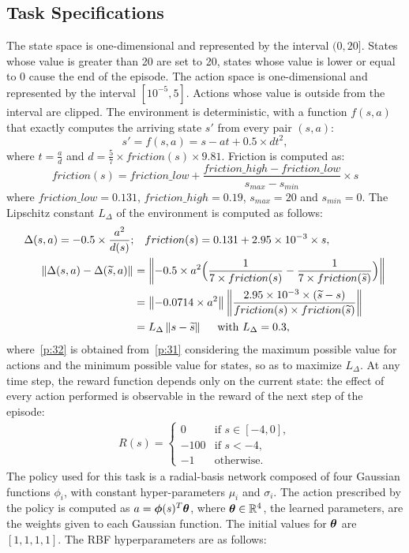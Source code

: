 \subsection*{Task Specifications}
The state space is one-dimensional and represented by the interval $(0,20]$. States whose value is greater than 20 are set to 20, states whose value is lower or equal to 0 cause the end of the episode. The action space is one-dimensional and represented by the interval $[10^{-5}, 5]$. Actions whose value is outside from the interval are clipped. The environment is deterministic, with a function $f(s,a)$ that exactly computes the arriving state $s'$ from every pair $(s,a)$:
\[
s'=f(s,a) = s - at + 0.5 \times dt^2,
\]
where $t=\frac{a}{d}$ and $d = \frac{5}{7} \times friction(s) \times 9.81$.
Friction is computed as:
\[
friction(s) = friction\_low + \frac{friction\_high - friction\_low}{s_{max} - s_{min}} \times s
\]
where $friction\_low=0.131$, $friction\_high=0.19$, $s_{max}=20$ and $s_{min}=0$. The Lipschitz constant $L_{\Delta}$ of the environment is computed as follows:\\
\begin{align}
\Delta(s,a) = -0.5 \times \frac{a^2}{d(s)}; &\quad friction(s) = 0.131 + 2.95 \times 10^{-3} \times s, \nonumber\\
\left\|\Delta(s,a) - \Delta(\widetilde{s},a)\right\|_{} &= \left\| -0.5 \times a^2 \Big(\frac{1}{7 \times friction(s)} - \frac{1}{7 \times friction(\widetilde{s})} \Big)\right\|_{} \nonumber\\
&= \left\|-0.0714 \times a^2\right\|_{}\left\|\frac {2.95 \times 10^{-3} \times (\widetilde{s} -s)} {friction(s) \times friction(\widetilde{s})}\right\|_{}\label{p:31}\\
&= L_{\Delta} \left\|s - \widetilde{s}\right\|_{} \quad \text{ with }L_{\Delta}=0.3, \label{p:32}
\end{align}
where~\eqref{p:32} is obtained from~\eqref{p:31} considering the maximum possible value for actions and the minimum possible value for states, so as to maximize $L_{\Delta}$.
At any time step, the reward function depends only on the current state: the effect of every action performed is observable in the reward of the next step of the episode: 
\begin{align}
R(s) = 
\begin{cases}
0 & \text{if } s \in [-4,0],\\
-100 & \text{if } s < -4,\\
-1 & \text{otherwise}.
\end{cases} \nonumber
\end{align}
The policy used for this task is a radial-basis network composed of four Gaussian functions $\phi_i$, with constant hyper-parameters $\mu_i$ and $\sigma_i$. The action prescribed by the policy is computed as $a = \boldsymbol{\phi}(s)^T\boldsymbol{\theta}$, where $\boldsymbol{\theta}\in\mathbb{R}^4$, the learned parameters, are the weights given to each Gaussian function. The initial values for $\boldsymbol{\theta}$ are $[1, 1, 1, 1]$. The RBF hyperparameters are as follows: 
